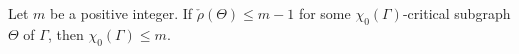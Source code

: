 Let $m$ be a positive integer. If $\check{\rho}(\Theta) \leq m - 1$ for some $\chi_0(\Gamma)$-critical subgraph $\Theta$ of $\Gamma$, then $\chi_0(\Gamma) \leq m$.
